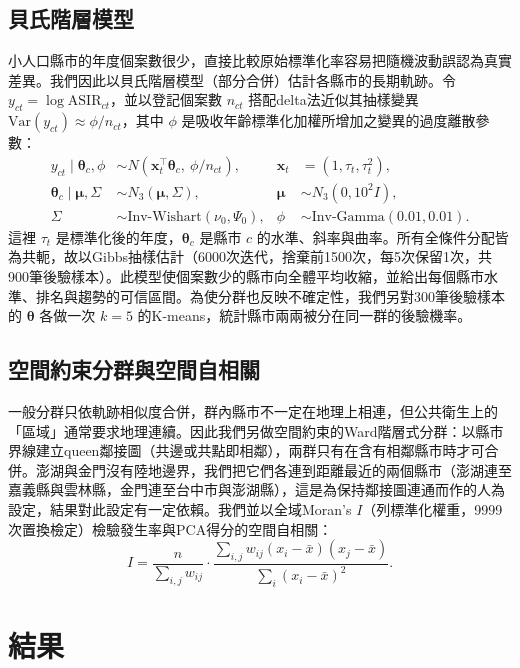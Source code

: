 \documentclass[UTF8,a4paper,11pt]{ctexart}
\begin{document}
\subsection{貝氏階層模型}\label{sec:bayes}
小人口縣市的年度個案數很少，直接比較原始標準化率容易把隨機波動誤認為真實差異。我們因此以貝氏階層模型（部分合併）估計各縣市的長期軌跡。令 $y_{ct}=\log \mathrm{ASIR}_{ct}$，並以登記個案數 $n_{ct}$ 搭配delta法近似其抽樣變異 $\mathrm{Var}(y_{ct})\approx\phi/n_{ct}$，其中 $\phi$ 是吸收年齡標準化加權所增加之變異的過度離散參數：
\begin{align}
y_{ct}\mid\boldsymbol\theta_c,\phi &\sim N\!\left(\mathbf x_t^{\top}\boldsymbol\theta_c,\ \phi/n_{ct}\right), & \mathbf x_t&=(1,\tau_t,\tau_t^2),\\
\boldsymbol\theta_c\mid\boldsymbol\mu,\Sigma &\sim N_3(\boldsymbol\mu,\Sigma), & \boldsymbol\mu&\sim N_3(0,10^2 I),\\
\Sigma&\sim \text{Inv-Wishart}(\nu_0,\Psi_0), & \phi&\sim \text{Inv-Gamma}(0.01,0.01).
\end{align}
這裡 $\tau_t$ 是標準化後的年度，$\boldsymbol\theta_c$ 是縣市 $c$ 的水準、斜率與曲率。所有全條件分配皆為共軛，故以Gibbs抽樣估計（6000次迭代，捨棄前1500次，每5次保留1次，共900筆後驗樣本）。此模型使個案數少的縣市向全體平均收縮，並給出每個縣市水準、排名與趨勢的可信區間。為使分群也反映不確定性，我們另對300筆後驗樣本的 $\boldsymbol\theta$ 各做一次 $k=5$ 的K-means，統計縣市兩兩被分在同一群的後驗機率。

\subsection{空間約束分群與空間自相關}\label{sec:spatial}
一般分群只依軌跡相似度合併，群內縣市不一定在地理上相連，但公共衛生上的「區域」通常要求地理連續。因此我們另做空間約束的Ward階層式分群：以縣市界線建立queen鄰接圖（共邊或共點即相鄰），兩群只有在含有相鄰縣市時才可合併。澎湖與金門沒有陸地邊界，我們把它們各連到距離最近的兩個縣市（澎湖連至嘉義縣與雲林縣，金門連至台中市與澎湖縣），這是為保持鄰接圖連通而作的人為設定，結果對此設定有一定依賴。我們並以全域Moran's $I$（列標準化權重，9999次置換檢定）檢驗發生率與PCA得分的空間自相關：
\begin{equation}
I=\frac{n}{\sum_{i,j}w_{ij}}\cdot\frac{\sum_{i,j}w_{ij}(x_i-\bar x)(x_j-\bar x)}{\sum_i (x_i-\bar x)^2}.
\end{equation}

\section{結果}
\end{document}
